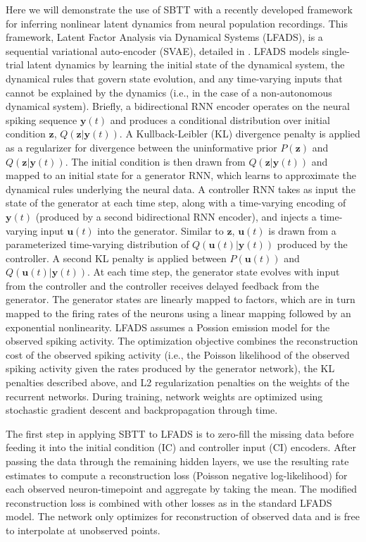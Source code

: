 \documentclass{article}
\begin{document}
Here we will demonstrate the use of SBTT with a recently developed framework for inferring nonlinear latent dynamics from neural population recordings. This framework, Latent Factor Analysis via Dynamical Systems (LFADS), is a sequential variational auto-encoder (SVAE), detailed in \cite{pandarinath2018inferring}. LFADS models single-trial latent dynamics by learning the initial state of the dynamical system, the dynamical rules that govern state evolution, and any time-varying inputs that cannot be explained by the dynamics (i.e., in the case of a non-autonomous dynamical system). Briefly, a bidirectional RNN encoder operates on the neural spiking sequence $\mathbf{y}(t)$ and produces a conditional distribution over initial condition $\mathbf{z}$, $Q(\mathbf{z}|\mathbf{y}(t))$. A Kullback-Leibler (KL) divergence penalty is applied as a regularizer for divergence between the uninformative prior $P(\mathbf{z})$ and $Q(\mathbf{z}|\mathbf{y}(t))$. The initial condition is then drawn from $Q(\mathbf{z}|\mathbf{y}(t))$ and mapped to an initial state for a generator RNN, which learns to approximate the dynamical rules underlying the neural data. A controller RNN takes as input the state of the generator at each time step, along with a time-varying encoding of $\mathbf{y}(t)$ (produced by a second bidirectional RNN encoder), and injects a time-varying input $\mathbf{u}(t)$ into the generator. Similar to $\mathbf{z}$, $\mathbf{u}(t)$ is drawn from a parameterized time-varying distribution of $Q(\mathbf{u}(t)|\mathbf{y}(t))$ produced by the controller. A second KL penalty is applied between $P(\mathbf{u}(t))$ and $Q(\mathbf{u}(t)|\mathbf{y}(t))$. At each time step, the generator state evolves with input from the controller and the controller receives delayed feedback from the generator. The generator states are linearly mapped to factors, which are in turn mapped to the firing rates of the neurons using a linear mapping followed by an exponential nonlinearity. LFADS assumes a Possion emission model for the observed spiking activity. The optimization objective combines the reconstruction cost of the observed spiking activity (i.e., the Poisson likelihood of the observed spiking activity given the rates produced by the generator network), the KL penalties described above, and L2 regularization penalties on the weights of the recurrent networks. During training, network weights are optimized using stochastic gradient descent and backpropagation through time.

The first step in applying SBTT to LFADS is to zero-fill the missing data before feeding it into the initial condition (IC) and controller input (CI) encoders. After passing the data through the remaining hidden layers, we use the resulting rate estimates to compute a reconstruction loss (Poisson negative log-likelihood) for each observed neuron-timepoint and aggregate by taking the mean. The modified reconstruction loss is combined with other losses as in the standard LFADS model. The network only optimizes for reconstruction of observed data and is free to interpolate at unobserved points.
\end{document}
